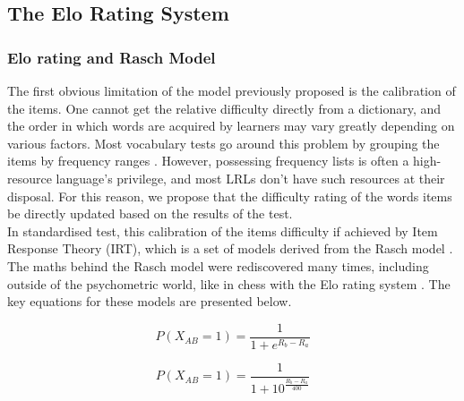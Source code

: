     \subsection{The Elo Rating System}
        \subsubsection{Elo rating and Rasch Model}
The first obvious limitation of the model previously proposed is the calibration of the items. One cannot get the relative difficulty directly from a dictionary, and the order in which words are acquired by learners may vary greatly depending on various factors. Most vocabulary tests go around this problem by grouping the items by frequency ranges \parencite{nation_teaching_1990, meara_complexities_1994, dudley_context-aligned_2024}. However, possessing frequency lists is often a high-resource language's privilege, and most LRLs don't have such resources at their disposal. For this reason, we propose that the difficulty rating of the words items be directly updated based on the results of the test.\\
In standardised test, this calibration of the items difficulty if achieved by Item Response Theory (IRT), which is a set of models derived from the Rasch model \parencite{rasch_probabilistic_1980}. The maths behind the Rasch model were rediscovered many times, including outside of the psychometric world, like in chess with the Elo rating system \parencite{elo_uscf_1961, elo_rating_1986}. The key equations for these models are presented below.\\
\begin{figure}[h]
    \centering
    \begin{minipage}{0.45\textwidth}
        \centering
            $$P(X_{AB} = 1)=\frac{1}{1+e^{R_b-R_a}}$$
    \end{minipage}
    \hfill
    \begin{minipage}{0.45\textwidth}
        \centering
            $$P(X_{AB} = 1)=\frac{1}{1+10^{\frac{R_b-R_a}{400}}}$$
        \label{Elo}
    \end{minipage}
\end{figure}

